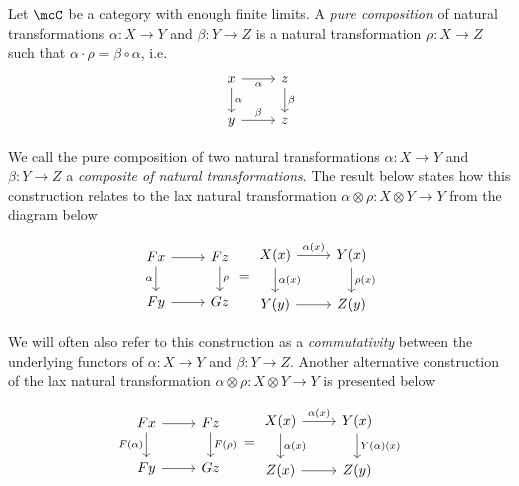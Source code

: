 \documentclass[a4paper,reqno,oneside]{article}
\begin{document}
\begin{definition}
	Let $\mcC$ be a category with enough finite limits. A \textit{pure composition} of natural transformations $\alpha : X \to Y$ and $\beta : Y \to Z$ is a natural transformation $\rho : X \to Z$ such that $\alpha \cdot \rho = \beta \circ \alpha$, i.e.
	\[
	\begin{tikzcd}
		x \ar[r, "\alpha"'] \ar[d, "\alpha"] & z \ar[d, "\beta"] \\
		y \ar[r, "\beta"] & z
	\end{tikzcd}
	\]
\end{definition}

We call the pure composition of two natural transformations $\alpha : X \to Y$ and $\beta : Y \to Z$ a \textit{composite of natural transformations}. The result below states how this construction relates to the lax natural transformation $\alpha \otimes \rho : X \otimes Y \to Y$ from the diagram below

\begin{equation}\label{eq:lax-preservation-on-diagrams}
	\begin{tikzcd}
		Fx \ar[r] \ar[d, "\alpha"'] & Fz \ar[d, "\rho"] \\
		Fy \ar[r] & Gz
	\end{tikzcd}
	=
	\begin{tikzcd}
		X(x) \ar[r, "\alpha(x)"] \ar[d, "\alpha(x)"] & Y(x) \ar[d, "\rho(x)"] \\
		Y(y) \ar[r] & Z(y)
	\end{tikzcd}
\end{equation}

We will often also refer to this construction as a \textit{commutativity} between the underlying functors of $\alpha : X \to Y$ and $\beta : Y \to Z$. Another alternative construction of the lax natural transformation $\alpha \otimes \rho : X \otimes Y \to Y$ is presented below

\begin{equation}\label{eq:lax-preservation-on-other-diagrams}
	\begin{tikzcd}
		Fx \ar[r] \ar[d, "F(\alpha)"'] & Fz \ar[d, "F(\rho)"] \\
		Fy \ar[r] & Gz
	\end{tikzcd}
	=
	\begin{tikzcd}
		X(x) \ar[r, "\alpha(x)"] \ar[d, "\alpha(x)"] & Y(x) \ar[d, "Y(\alpha)(x)"] \\
		Z(x) \ar[r] & Z(y)
	\end{tikzcd}
\end{equation}
\end{document}
